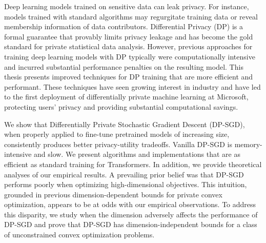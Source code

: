 
Deep learning models trained on sensitive data can leak privacy.
For instance, models trained with standard algorithms may regurgitate training data or reveal membership information of data contributors.
Differential Privacy (DP) is a formal guarantee that provably limits privacy leakage and has become the gold standard for private statistical data analysis.
However, previous approaches for training deep learning models with DP typically were computationally intensive and incurred substantial performance penalties on the resulting model.
This thesis presents improved techniques for DP training that are more efficient and performant.
These techniques have seen growing interest in industry and have led to the first deployment of differentially private machine learning at Microsoft, protecting users' privacy and providing substantial computational savings.

We show that Differentially Private Stochastic Gradient Descent (DP-SGD), when properly applied to fine-tune pretrained models of increasing size, consistently produces better privacy-utility tradeoffs. Vanilla DP-SGD is memory-intensive and slow. We present algorithms and implementations that are as efficient as standard training for Transformers.
In addition, we provide theoretical analyses of our empirical results.
A prevailing prior belief was that DP-SGD performs poorly when optimizing high-dimensional objectives. 
This intuition, grounded in previous dimension-dependent bounds for private convex optimization, appears to be at odds with our empirical observations. 
To address this disparity, we study when the dimension adversely affects the performance of DP-SGD and prove that DP-SGD has dimension-independent bounds for a class of unconstrained convex optimization problems. 
